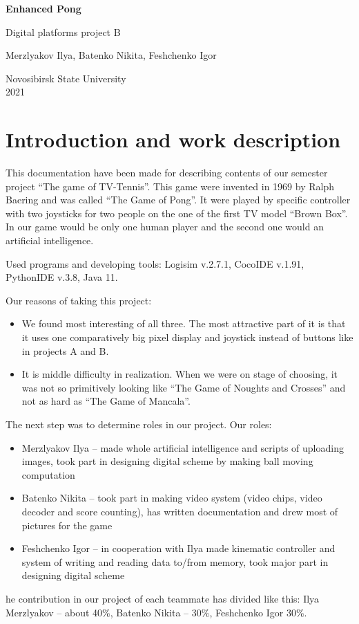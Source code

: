 \documentclass[12pt,a4paper]{article}
\let\oldsection\section
\renewcommand\section{\clearpage\oldsection}
\begin{document}
    \begin{titlepage}
        \begin{center}
            {\Huge \textbf {Enhanced Pong}}

            \vspace{0.5cm}
            {\LARGE Digital platforms project B}

            \vspace{1.5cm}
            Merzlyakov Ilya, Batenko Nikita, Feshchenko Igor

            \vfill
            Novosibirsk State University \\
            2021

        \end{center}
    \end{titlepage}
    \tableofcontents
    \section{Introduction and work description}

    This documentation have been made for describing contents of our semester project “The game of TV-Tennis”.  This game were invented in 1969 by Ralph Baering and was called “The Game of Pong”. It were played by specific controller with two joysticks for two people on the one of the first TV model “Brown Box”. In our game would be only one human player and the second one would an artificial intelligence.

    Used programs and developing tools: Logisim v.2.7.1, CocoIDE v.1.91, PythonIDE v.3.8, Java 11.

    Our reasons of taking this project:
    \begin{itemize}
        \item We found most interesting of all three. The most attractive part of it is that it uses one comparatively big pixel display and joystick instead of buttons like in projects A and B.
        \item It is middle difficulty in realization. When we were on stage of choosing, it was not so primitively looking like “The Game of Noughts and Crosses” and not as hard as “The Game of Mancala”. 
    \end{itemize}
    The next step was to determine roles in our project. Our roles:
    \begin{itemize}
        \item Merzlyakov Ilya – made whole artificial intelligence and scripts of uploading images, took part in designing digital scheme by making ball moving computation
        \item Batenko Nikita – took part in making video system (video chips, video decoder and score counting), has written documentation and drew most of pictures for the game
        \item Feshchenko Igor – in cooperation with Ilya made kinematic controller and system of writing and reading data to/from memory, took major part in designing digital scheme
    \end{itemize}
    he contribution in our project of each teammate has divided like this: 
    Ilya Merzlyakov – about 40\%, Batenko Nikita – 30\%, Feshchenko Igor 30\%.
\end{document}

